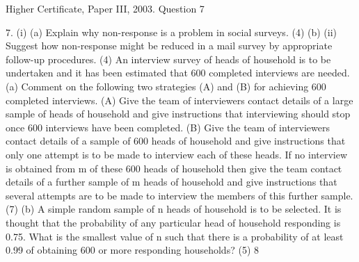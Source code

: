 \documentclass[a4paper,12pt]{article}
\begin{document}
Higher Certificate, Paper III, 2003. Question 7

\begin{framed}
7.
(i)
(a)
Explain why non-response is a problem in social surveys.
(4)
(b)
(ii)
Suggest how non-response might be reduced in a mail survey by
appropriate follow-up procedures.
(4)
An interview survey of heads of household is to be undertaken and it has been
estimated that 600 completed interviews are needed.
(a)
Comment on the following two strategies (A) and (B) for achieving
600 completed interviews.
(A)
Give the team of interviewers contact details of a large sample
of heads of household and give instructions that interviewing should
stop once 600 interviews have been completed.
(B)
Give the team of interviewers contact details of a sample of 600
heads of household and give instructions that only one attempt is to be
made to interview each of these heads. If no interview is obtained from
m of these 600 heads of household then give the team contact details of
a further sample of m heads of household and give instructions that
several attempts are to be made to interview the members of this
further sample.
(7)
(b)
A simple random sample of n heads of household is to be selected. It is
thought that the probability of any particular head of household
responding is 0.75. What is the smallest value of n such that there is a
probability of at least 0.99 of obtaining 600 or more responding
households?
(5)
8

\end{framed}
\end{document}
